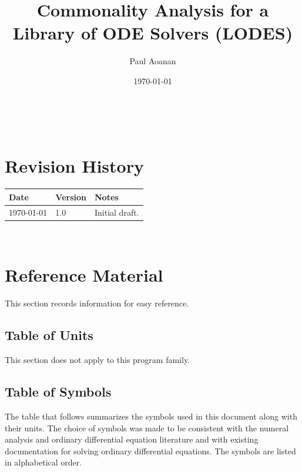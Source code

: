 \documentclass[12pt]{article}
\newcommand{\famname}{LODES} %
\newcommand{\famdesc}{Library of ODE Solvers}
\begin{document}
\title{Commonality Analysis for a \famdesc{} (\famname{})} 
\author{Paul Aoanan}
\date{\today}

\maketitle

~\newpage


\section{Revision History}

\begin{tabularx}{\textwidth}{p{3cm}p{2cm}X}
\toprule {\bf Date} & {\bf Version} & {\bf Notes}\\
\midrule
\today & 1.0 & Initial draft.\\
\bottomrule
\end{tabularx}

~\newpage
	
\section{Reference Material}

This section records information for easy reference.

\subsection{Table of Units}

This section does not apply to this program family.

\subsection{Table of Symbols}

The table that follows summarizes the symbols used in this document along with
their units.  The choice of symbols was made to be consistent with the numeral analysis
and ordinary differential equation literature and with existing documentation
for solving ordinary differential equations.  The symbols are listed in alphabetical order.
\end{document}

